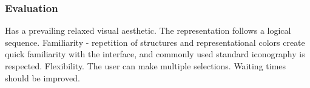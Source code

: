 \subsubsection*{Evaluation}

\begin{itemize}
    \done Has a prevailing relaxed visual aesthetic.
    \done The representation follows a logical sequence.
    \done Familiarity - repetition of structures and representational colors create quick familiarity with the interface, and commonly used standard iconography is respected.
    \done Flexibility. The user can make multiple selections.
    \crossed Waiting times should be improved.
\end{itemize}